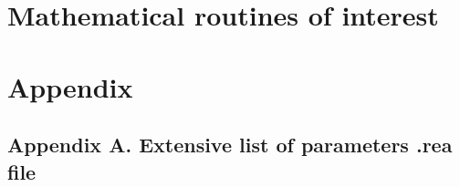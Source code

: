 \documentclass[11pt]{report}              %
\begin{document}
\chapter{Mathematical routines of interest}


%
\begin{comment}
\chapter{Postprocessing}
\section{Visualisation}

\end{comment} 
\chapter{Appendix}
\section{Appendix A. Extensive list of parameters .rea file}

\end{document}
